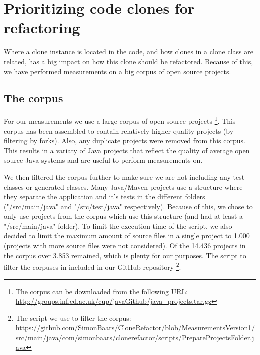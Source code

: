 \chapter{Prioritizing code clones for refactoring}
\label{ch:research_method}
Where a clone instance is located in the code, and how clones in a clone class are related, has a big impact on how this clone should be refactored. Because of this, we have performed measurements on a big corpus of open source projects.

\section{The corpus}
For our measurements we use a large corpus of open source projects \cite{githubCorpus2013}\footnote{The corpus can be downloaded from the following URL: \url{http://groups.inf.ed.ac.uk/cup/javaGithub/java_projects.tar.gz}}. This corpus has been assembled to contain relatively higher quality projects (by filtering by forks). Also, any duplicate projects were removed from this corpus. This results in a variaty of Java projects that reflect the quality of average open source Java systems and are useful to perform measurements on.

We then filtered the corpus further to make sure we are not including any test classes or generated classes. Many Java/Maven projects use a structure where they separate the application and it's tests in the different folders ("/src/main/java" and "/src/test/java" respectively). Because of this, we chose to only use projects from the corpus which use this structure (and had at least a "/src/main/java" folder). To limit the execution time of the script, we also decided to limit the maximum amount of source files in a single project to 1.000 (projects with more source files were not considered). Of the 14.436 projects in the corpus over 3.853 remained, which is plenty for our purposes. The script to filter the corpuses in included in our GitHub repository \footnote{The script we use to filter the corpus: \url{https://github.com/SimonBaars/CloneRefactor/blob/MeasurementsVersion1/src/main/java/com/simonbaars/clonerefactor/scripts/PrepareProjectsFolder.java}}.
